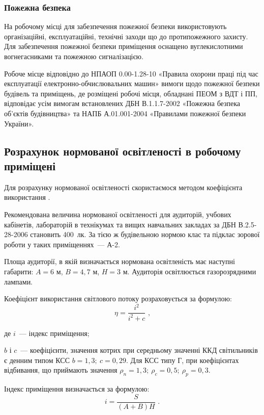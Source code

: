 \documentclass[a4paper,ukrainian,utf8,nocolumnsxix,nocolumnxxxii,nocolumnxxxi,floatsection,equationsection]{eskdtext}
\renewcommand\paragraph{\subsubsection}
\begin{document}
\paragraph{Пожежна безпека}

На робочому місці для забезпечення пожежної безпеки використовують організаційні, експлуатаційні, технічні заходи що до протипожежного захисту. Для забезпечення пожежної безпеки  приміщення оснащено вуглекислотними вогнегасниками та пожежною сигналізацією.

Робоче місце відповідно до НПАОП 0.00-1.28-10 «Правила охорони праці під час експлуатації електронно-обчислювальних машин» вимоги  щодо пожежної безпеки будівель та приміщень, де розміщені робочі місця, обладнані ПЕОМ з ВДТ і ПП, відповідає усім вимогам встановлених ДБН В.1.1.7-2002 «Пожежна безпека  об'єктів будівництва» та НАПБ А.01.001-2004 «Правилами пожежної безпеки України».

\subsection{Розрахунок нормованої освітленості в робочому приміщені}

Для розрахунку нормованої освітленості скористаємося методом коефіцієнта використання \cite{work:safety:18}.

Рекомендована величина нормованої освітленості для аудиторій, учбових кабінетів, лабораторій в технікумах та вищих навчальних закладах за ДБН В.2.5-28-2006 становить 400~лк. За тією ж будівельною нормою клас та підклас зорової роботи у таких приміщеннях~--- А-2.

Площа аудиторії, в якій визначається нормована освітленість має наступні габарити: $A = 6$ м, $B = 4,7$ м, $H = 3$ м. Аудиторія освітлюється газорозрядними лампами.

Коефіцієнт використання світлового потоку розраховується за формулою:
\begin{equation}
	\eta = \frac{i^2}{i^2 + c} \text{ ,}
\end{equation}

де $i$~--- індекс приміщення;

$b$ і $c$~--- коефіцієнти, значення котрих при середньому значенні ККД світильників є денним типом КСС $b=1,3;\:c = 0,29$. Для КСС типу Г, при коефіцієнтах відбивання, що приймають значення $\rho_n = 1,3;\: \rho_c=0,5;\: \rho_p=0,3$.

Індекс приміщення визначається за формулою:
\begin{equation}
	i = \frac{S}{(A + B)H} \text{ .}
\end{equation}
\end{document}

